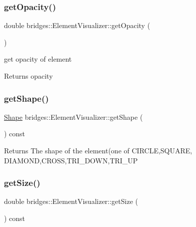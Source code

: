 \subsubsection{\texorpdfstring{get\+Opacity()}{getOpacity()}}
{\footnotesize\ttfamily double bridges\+::\+Element\+Visualizer\+::get\+Opacity (\begin{DoxyParamCaption}{ }\end{DoxyParamCaption})\hspace{0.3cm}{\ttfamily [inline]}}

get opacity of element

\begin{DoxyReturn}{Returns}
opacity 
\end{DoxyReturn}
\hypertarget{classbridges_1_1_element_visualizer_a2348ed705c5c6f85082e2aff11d439e7}{}\label{classbridges_1_1_element_visualizer_a2348ed705c5c6f85082e2aff11d439e7} 
\subsubsection{\texorpdfstring{get\+Shape()}{getShape()}}
{\footnotesize\ttfamily \hyperlink{namespacebridges_a1b4050586bd708782ae0d4f3b06b9579}{Shape} bridges\+::\+Element\+Visualizer\+::get\+Shape (\begin{DoxyParamCaption}{ }\end{DoxyParamCaption}) const\hspace{0.3cm}{\ttfamily [inline]}}

\begin{DoxyReturn}{Returns}
The shape of the element(one of C\+I\+R\+C\+LE,S\+Q\+U\+A\+RE, D\+I\+A\+M\+O\+ND,C\+R\+O\+SS,T\+R\+I\+\_\+\+D\+O\+WN,T\+R\+I\+\_\+\+UP 
\end{DoxyReturn}
\hypertarget{classbridges_1_1_element_visualizer_a3a1ab72360099d615ad582e5780143ad}{}\label{classbridges_1_1_element_visualizer_a3a1ab72360099d615ad582e5780143ad} 
\subsubsection{\texorpdfstring{get\+Size()}{getSize()}}
{\footnotesize\ttfamily double bridges\+::\+Element\+Visualizer\+::get\+Size (\begin{DoxyParamCaption}{ }\end{DoxyParamCaption}) const\hspace{0.3cm}{\ttfamily [inline]}}

